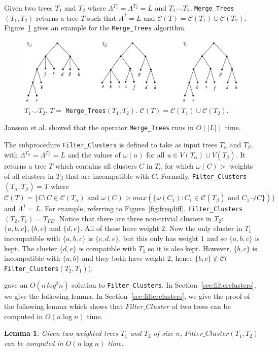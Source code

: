 \documentclass[final,1p,times]{elsarticle}
\newcommand{\compatible}{\smile}
\newcommand{\leafset}{\Lambda}
\newcommand{\weight}{\omega}
\newcommand{\TA}{T_\alpha}
\newcommand{\TB}{T_\beta}
\newtheorem{lemma}[theorem]{Lemma}
\begin{document}
    Given two trees $T_1$ and $T_2$ where $\leafset^{T_1} = \leafset^{T_2} = L$ and $T_1 \compatible T_2$, \texttt{Merge\_Trees}$(T_1, T_2)$ returns a tree $T$ such that $\leafset^T = L$ and $\mathcal{C}(T) = \mathcal{C}(T_1) \cup \mathcal{C}(T_2)$. Figure~\ref{fig:mergetrees} gives an example for the \texttt{Merge\_Trees} algorithm.

    \begin{figure}[ht]
        \includegraphics[scale=0.5]{mergetrees}
        \centering
        \caption[The \texttt{Merge\_Trees} algorithm]{$T_1 \compatible T_2$. $T =$ \texttt{Merge\_Trees}$(T_1, T_2)$. $\mathcal{C}(T) = \mathcal{C}(T_1) \cup \mathcal{C}(T_2)$.}
        \label{fig:mergetrees}
    \end{figure}
    Jansson et al.\cite{jansson2016improved} showed that the operator \texttt{Merge\_Trees} runs in $O(|L|)$ time.

    The subprocedure \texttt{Filter\_Clusters} is defined to take as input trees $\TA$ and $\TB$, with $\leafset^{\TA} = \leafset^{\TB} = L$ and the values of $\weight(u)$ for all $u \in V(\TA) \cup V(\TB)$. It returns a tree $T$ which contains all clusters $C$ in $\TA$ for which $\weight(C) > $ weights of all clusters in $\TB$ that are incompatible with $C$. Formally, \texttt{Filter\_Clusters}$(\TA, \TB) = T$ where $\mathcal{C}(T) = \{C : C \in \mathcal{C}(\TA) \text{ and } \weight(C) > max(\{\weight(C_1) : C_1 \in \mathcal{C}(\TB) \text{ and } C_1 \not\compatible C\})\}$ and $\leafset^T = L$. For example, referring to Figure~\ref{fig:freqdiff}, \texttt{Filter\_Clusters}$(T_2, T_1) = T_{FD}$. Notice that there are three non-trivial clusters in $T_2$: $\{a, b, c\}, \{b, c\}$ and $\{d, e\}$. All of these have weight $2$. Now the only cluster in $T_1$ incompatible with $\{a, b, c\}$ is $\{c, d, e\}$, but this only has weight $1$ and so $\{a, b, c\}$ is kept. The cluster $\{d, e\}$ is compatible with $T_1$ so it is also kept. However, $\{b, c\}$ is incompatible with $\{a, b\}$ and they both have weight $2$, hence $\{b, c\} \not\in \mathcal{C}($\texttt{Filter\_Clusters}$(T_2, T_1))$.

    \cite{jansson2018algorithms} gave an $O(n\,log^2n)$ solution to \texttt{Filter\_Clusters}. In Section~\ref{sec:filterclusters}, we give the following lemma.
    In Section~\ref{sec:filterclusters}, we give the proof of the following lemma which shows that $Filter\_Cluster$ of two trees can be computed in $O(n \log n)$ time.
    \begin{lemma}
	    \label{lem-filter-cluster-time}
	    Given two weighted trees $T_1$ and $T_2$ of size $n$,
	    $Filter\_Cluster(T_1, T_2)$ can be computed in $O(n \log n)$ time.
    \end{lemma}
\end{document}
